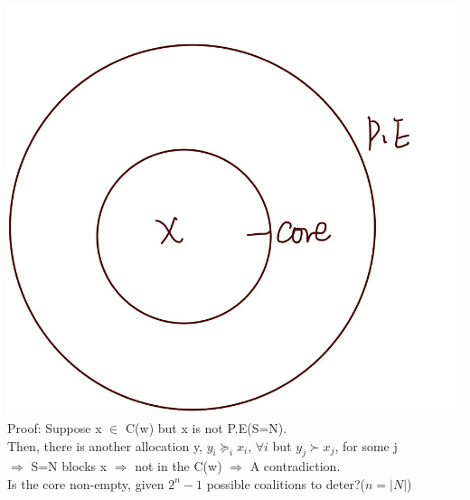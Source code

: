 \documentclass[letterpaper,13pt,single,pdftex]{scrartcl}
\begin{document}
\includegraphics[scale = 0.1]{core.jpg}\\
Proof: 
Suppose x $\in$ C(w) but x is not P.E(S=N). \\
Then, there is another allocation y, $y_i \succeq_i x_i, \, \forall i$ but $y_j \succ x_j$, for some j\\
$\Rightarrow$ S=N blocks x $\Rightarrow$ not in the C(w) $\Rightarrow$ A contradiction.\\

Is the core non-empty, given $2^n -1$ possible coalitions to deter?($n= |N|$)\\
\end{document}
